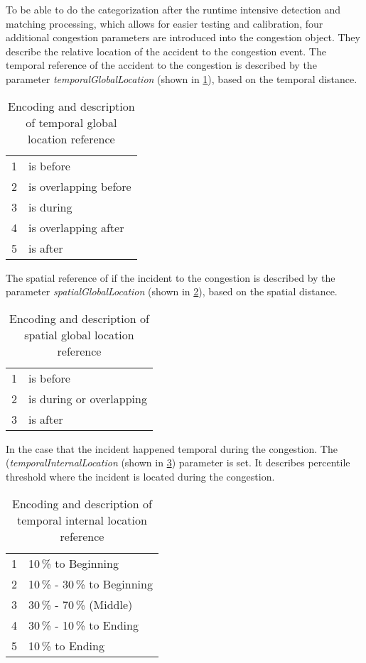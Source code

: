 To be able to do the categorization after the runtime intensive detection and matching processing, which allows for easier testing and calibration, four additional congestion parameters are introduced into the congestion object. They describe the relative location of the accident to the congestion event. The temporal reference of the accident to the congestion is described by the parameter \textit{temporalGlobalLocation} (shown in \cref{tbl:jam_classification_GLT}), based on the temporal distance.
\begin{table}[ht!]
	\centering
	\begin{tabular}{c|l}  
		1 & is before \\ 
 		2 & is overlapping before \\ 
 		3 & is during \\
 		4 & is overlapping after \\
 		5 & is after \\
	\end{tabular}
	\caption{Encoding and description of temporal global location reference}
	\label{tbl:jam_classification_GLT}
	\vspace{-4mm}
\end{table}
The spatial reference of if the incident to the congestion is described by the parameter \textit{spatialGlobalLocation} (shown in \cref{tbl:jam_classification_GLS}), based on the spatial distance.
\begin{table}[ht!]
	\centering
	\begin{tabular}{c|l}  
		1 & is before \\ 
 		2 & is during or overlapping \\ 
 		3 & is after \\ 
	\end{tabular}
	\caption{Encoding and description of spatial global location reference}
	\label{tbl:jam_classification_GLS}
	\vspace{-4mm}
\end{table}
In the case that the incident happened temporal during the congestion. The (\textit{temporalInternalLocation} (shown in \cref{tbl:jam_classification_ILT}) parameter is set. It describes percentile threshold where the incident is located during the congestion.
\begin{table}[ht!]
	\centering
	\begin{tabular}{c|l}  
		1 & 10\,\% to Beginning \\
 		2 & 10\,\% - 30\,\% to Beginning \\
 		3 & 30\,\% - 70\,\% (Middle) \\
 		4 & 30\,\% - 10\,\% to Ending \\
 		5 & 10\,\% to Ending \\
	\end{tabular}
	\caption{Encoding and description of temporal internal location reference}
	\label{tbl:jam_classification_ILT}
	\vspace{-4mm}
\end{table}
